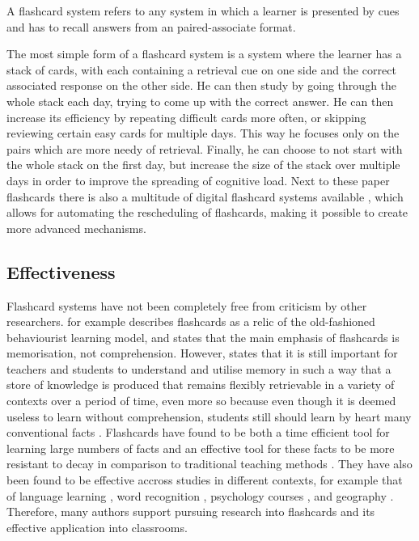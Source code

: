 \begin{definition}
    A flashcard system refers to any system in which a learner is presented by cues and has to recall answers from an paired-associate format.
\end{definition}

The most simple form of a flashcard system is a system where the learner has a stack of cards, with each containing a retrieval cue on one side and the correct associated response on the other side. He can then study by going through the whole stack each day, trying to come up with the correct answer. He can then increase its efficiency by repeating difficult cards more often, or skipping reviewing certain easy cards for multiple days. This way he focuses only on the pairs which are more needy of retrieval. Finally, he can choose to not start with the whole stack on the first day, but increase the size of the stack over multiple days in order to improve the spreading of cognitive load. Next to these paper flashcards there is also a multitude of digital flashcard systems available \cite{hwang2, nakata, microlearning}, which allows for automating the rescheduling of flashcards, making it possible to create more advanced mechanisms.

\subsection{Effectiveness}

Flashcard systems have not been completely free from criticism by other researchers.  for example describes flashcards as a relic of the old-fashioned behaviourist learning model, and  states that the main emphasis of flashcards is memorisation, not comprehension. However,  states that it is still important for teachers and students to understand and utilise memory in such a way that a store of knowledge is produced that remains flexibly retrievable in a variety of contexts over a period of time, even more so because even though it is deemed useless to learn without comprehension, students still should learn by heart many conventional facts \cite{glaserfield}. Flashcards have found to be both a time efficient tool for learning large numbers of facts and an effective tool for these facts to be more resistant to decay in comparison to traditional teaching methods \cite{nakata}. They have also been found to be effective accross studies in different contexts, for example that of language learning \cite{chien, nakata, macquarrie, mccullough}, word recognition \cite{joseph}, psychology courses \cite{burgess, golding}, and geography \cite{zirkle}. Therefore, many authors support pursuing research into flashcards and its effective application into classrooms.

